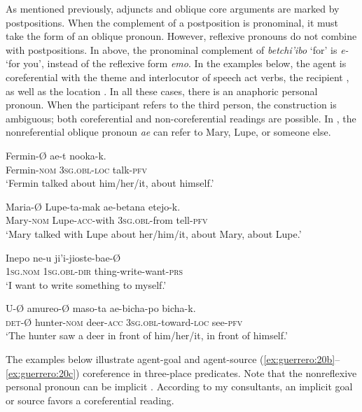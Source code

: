 \documentclass[output=paper]{langscibook}
\begin{document}
As mentioned previously, adjuncts and oblique core arguments are marked by postpositions. When the complement of a postposition is pronominal, it must take the form of an oblique pronoun. However, reflexive pronouns do not combine with postpositions. In  above, the pronominal complement of \textit{betchi’ibo} ‘for’ is \textit{e-} ‘for you’, instead of the reflexive form \textit{emo}. In the examples below, the agent is coreferential with the theme  and interlocutor  of speech act verbs, the recipient , as well as the location . In all these cases, there is an anaphoric personal pronoun. When the participant refers to the third person, the construction is ambiguous; both coreferential and non-coreferential readings are possible. In , the nonreferential oblique pronoun \textit{ae} can refer to Mary, Lupe, or someone else.



\ea%
    \label{ex:guerrero:21}

\ea
\label{ex:guerrero:21a}
\gll Fermin-Ø     ae-t       nooka-k.\\
  Fermin-\textsc{nom}  \textsc{3sg.obl-loc}    talk-\textsc{pfv}\\
\glt ‘Fermin talked about him/her/it, about himself.’

\ex
\label{ex:guerrero:21b}
\gll Maria-Ø   Lupe-ta-mak   ae-betana   etejo-k.\\
  Mary\textsc{{}-nom}  Lupe-\textsc{acc-}with    \textsc{3sg.obl-}from  tell-\textsc{pfv}\\
\glt ‘Mary talked with Lupe about her/him/it, about Mary, about Lupe.’

\ex
\label{ex:guerrero:21c}
\gll Inepo  ne-u     ji’i-jioste-bae-Ø\\
    \textsc{1sg.nom}  \textsc{1sg.obl-dir}  thing-write-want-\textsc{prs} \\
\glt ‘I want to write something to myself.’

\ex
\label{ex:guerrero:21d}
\gll U-Ø   amureo-Ø  maso-ta  ae-bicha-po   bicha-k.\\
    \textsc{det-Ø}  hunter-\textsc{nom}  deer-\textsc{acc}   \textsc{3sg.obl}{}-toward\textsc{{}-loc}  see-\textsc{pfv}\\
\glt ‘The hunter saw a deer in front of him/her/it, in front of himself.’
\z
\z



The examples below illustrate agent-goal  and agent-source (\ref{ex:guerrero:20b}--\ref{ex:guerrero:20c}) coreference in three-place predicates. Note that the nonreflexive personal pronoun can be implicit . According to my consultants, an implicit goal or source favors a coreferential reading.
\end{document}
